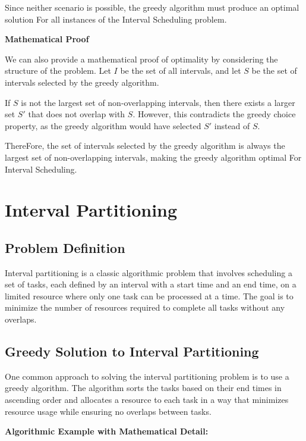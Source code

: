 \documentclass[12pt]{book} %
\begin{document}
Since neither scenario is possible, the greedy algorithm must produce an optimal solution For all instances of the Interval Scheduling problem.

\textbf{Mathematical Proof}

We can also provide a mathematical proof of optimality by considering the structure of the problem. Let \( I \) be the set of all intervals, and let \( S \) be the set of intervals selected by the greedy algorithm.

If \( S \) is not the largest set of non-overlapping intervals, then there exists a larger set \( S' \) that does not overlap with \( S \). However, this contradicts the greedy choice property, as the greedy algorithm would have selected \( S' \) instead of \( S \).

ThereFore, the set of intervals selected by the greedy algorithm is always the largest set of non-overlapping intervals, making the greedy algorithm optimal For Interval Scheduling.


\section{Interval Partitioning}
\subsection{Problem Definition}
Interval partitioning is a classic algorithmic problem that involves scheduling a set of tasks, each defined by an interval with a start time and an end time, on a limited resource where only one task can be processed at a time. The goal is to minimize the number of resources required to complete all tasks without any overlaps.

\subsection{Greedy Solution to Interval Partitioning}
One common approach to solving the interval partitioning problem is to use a greedy algorithm. The algorithm sorts the tasks based on their end times in ascending order and allocates a resource to each task in a way that minimizes resource usage while ensuring no overlaps between tasks.

\textbf{Algorithmic Example with Mathematical Detail:}
\FloatBarrier
\end{document}
